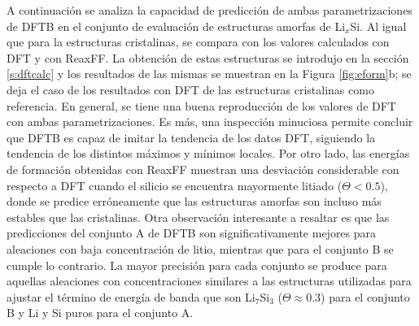 A continuación se analiza la capacidad de predicción de ambas parametrizaciones
de DFTB en el conjunto de evaluación de estructuras amorfas de Li$_x$Si. Al
igual que para la estructuras cristalinas, se compara con los valores
calculados con DFT y con ReaxFF. La obtención de estas estructuras se introdujo
en la sección \ref{s:dftcalc} y los resultados de las mismas se muestran
en la Figura \ref{fig:eform}b; se deja el caso de los resultados con DFT de
las estructuras cristalinas como referencia. En general, se tiene una buena
reproducción de los valores de DFT con ambas parametrizaciones. Es más, una
inspección minuciosa permite concluir que DFTB es capaz de imitar la tendencia
de los datos DFT, siguiendo la tendencia de los distintos máximos y mínimos
locales. Por otro lado, las energías de formación obtenidas con ReaxFF muestran
una desviación considerable con respecto a DFT cuando el silicio se encuentra
mayormente litiado ($\Theta < 0.5$), donde se predice erróneamente que las
estructuras amorfas son incluso más estables que las cristalinas. Otra
observación interesante a resaltar es que las predicciones del conjunto A de
DFTB son significativamente mejores para aleaciones con baja concentración de
litio, mientras que para el conjunto B se cumple lo contrario. La mayor
precisión para cada conjunto se produce para aquellas aleaciones con
concentraciones similares a las estructuras utilizadas para ajustar el término
de energía de banda que son Li$_7$Si$_3$ ($\Theta \approx 0.3$) para el conjunto
B y Li y Si puros para el conjunto A.
